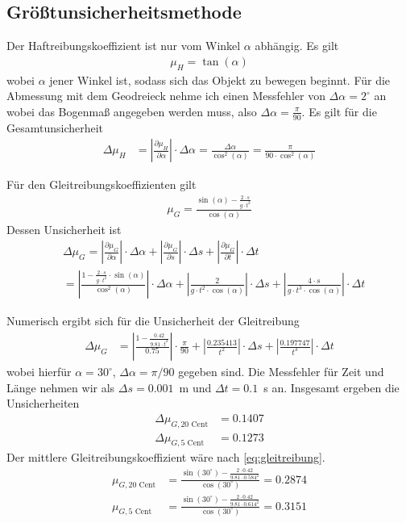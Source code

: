 \documentclass{article}
\begin{document}
\subsection{Größtunsicherheitsmethode}

Der Haftreibungskoeffizient ist nur vom Winkel $\alpha$ abhängig. Es gilt
\begin{align}
\mu_H = \tan(\alpha)
\end{align}
wobei $\alpha$ jener Winkel ist, sodass sich das Objekt zu bewegen beginnt. Für die Abmessung mit dem Geodreieck nehme ich einen Messfehler von $\Delta\alpha = 2^\circ$ an wobei das Bogenmaß angegeben werden muss, also $\Delta\alpha = \frac{\pi}{90}$.
Es gilt für die Gesamtunsicherheit
\begin{align}
\Delta\mu_H &= \left|\frac{\partial \mu_H}{\partial \alpha}\right| \cdot \Delta \alpha = \frac{\Delta\alpha}{\cos^2(\alpha) } = \frac{\pi}{90\cdot \cos^2(\alpha)}
\end{align}


Für den Gleitreibungskoeffizienten gilt
\begin{align}
\mu_G = \frac{\sin(\alpha) - \frac{2\cdot s}{g\cdot t^2}}{\cos(\alpha)}
\end{align}
Dessen Unsicherheit ist 
\begin{align}
&\Delta\mu_G = \left|\frac{\partial \mu_G}{\partial \alpha}\right| \cdot \Delta\alpha + \left|\frac{\partial\mu_G}{\partial s}\right| \cdot \Delta s + \left|\frac{\partial\mu_G}{\partial t}\right| \cdot \Delta t \\
&= \left| \frac{1 - \frac{2\cdot s}{g\cdot t^2} \cdot \sin(\alpha)}{\cos^2(\alpha)}\right|\cdot \Delta\alpha + \left| \frac{2}{g\cdot t^2\cdot \cos(\alpha)} \right| \cdot \Delta s + \left| \frac{4\cdot s}{g\cdot t^3\cdot \cos(\alpha)} \right| \cdot \Delta t
\end{align}



Numerisch ergibt sich für die Unsicherheit der Gleitreibung 
\begin{align}
\Delta\mu_{G} &= \left| \frac{1 - \frac{0.42}{9.81\cdot t^2} }{0.75}\right|\cdot \frac{\pi}{90} + \left| \frac{0.235413}{t^2} \right| \cdot \Delta s + \left| \frac{0.197747}{t^3} \right| \cdot \Delta t
\end{align}
wobei hierfür $\alpha=30^\circ$, $\Delta \alpha = \pi/90$ gegeben sind. Die Messfehler für Zeit und Länge nehmen wir als $\Delta s = 0.001$~m und $\Delta t = 0.1$~s an. Insgesamt ergeben die Unsicherheiten 
\begin{align}
\Delta\mu_{G,\text{20 Cent}} &= 0.1407 \\
\Delta\mu_{G,\text{5 Cent}} &= 0.1273 
\end{align}
Der mittlere Gleitreibungskoeffizient wäre nach \eqref{eq:gleitreibung}.
\begin{align}
\mu_{G,\text{20 Cent}} &= \frac{\sin\left(30^\circ\right) - \frac{2\cdot 0.42}{9.81\cdot 0.584^2}}{\cos\left(30^\circ\right)} = 0.2874 \\
\mu_{G,\text{5 Cent}} &= \frac{\sin\left(30^\circ\right) - \frac{2\cdot 0.42}{9.81\cdot 0.614^2}}{\cos\left(30^\circ\right)} = 0.3151
\end{align}
\end{document}
